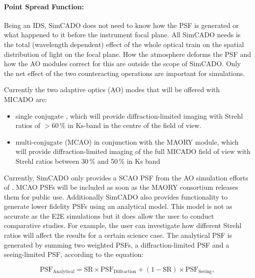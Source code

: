 \paragraph{Point Spread Function:} Being an IDS, SimCADO does not need to know how the PSF is generated or what happened to it before the instrument focal plane. All SimCADO needs is the total (wavelength dependent) effect of the whole optical train on the spatial distribution of light on the focal plane. How the atmosphere deforms the PSF and how the AO modules correct for this are outside the scope of SimCADO. Only the net effect of the two counteracting operations are important for simulations.

Currently the two adaptive optics (AO) modes that will be offered with MICADO are: 
\begin{itemize}

    \item single conjugate \citep[SCAO,][]{clenet2016}, which will provide diffraction-limited imaging with Strehl ratios of $>60\,$\% in Ks-band in the centre of the field of view.
    \item multi-conjugate (MCAO) in conjunction with the MAORY module, which will provide diffraction-limited imaging of the full MICADO field of view with Strehl ratios between 30\,\% and 50\,\% in Ks band \citep{maory2016}

\end{itemize}

Currently, SimCADO only provides a SCAO PSF from the AO simulation efforts of \citet[obtained via private communication]{clenet2015}. MCAO PSFs will be included as soon as the MAORY consortium releases them for public use. Additionally SimCADO also provides functionality to generate lower fidelity PSFs using an analytical model. This model is not as accurate as the E2E simulations but it does allow the user to conduct comparative studies. For example, the user can investigate how different Strehl ratios will affect the results for a certain science case. The analytical PSF is generated by summing two weighted PSFs, a diffraction-limited PSF and a seeing-limited PSF, according to the equation:

\begin{equation}
   \mathrm{PSF}_{\mathrm{Analytical}} = \mathrm{SR} \times \mathrm{PSF}_{\mathrm{Diffraction}} + (1 - \mathrm{SR}) \times \mathrm{PSF}_{\mathrm{Seeing}}, 
   \label{eq:strehl_ratio}
\end{equation}

